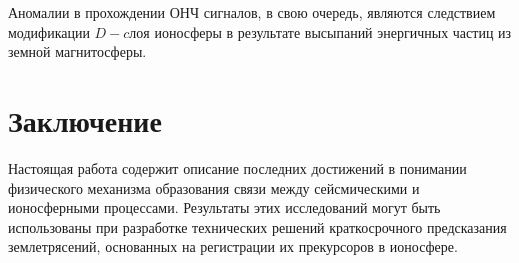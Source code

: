 \documentclass[12pt, oneside, a4paper]{article}
\begin{document}
Аномалии в прохождении ОНЧ сигналов, в свою очередь, являются следствием модификации $D-cлоя$ ионосферы в результате высыпаний энергичных частиц из земной магнитосферы.
\section{Заключение}
Настоящая работа содержит описание последних достижений в понимании физического механизма образования связи между сейсмическими и ионосферными процессами. Результаты этих исследований могут быть использованы при разработке технических решений краткосрочного предсказания землетрясений, основанных на регистрации их прекурсоров в ионосфере. 
\newpage


\end{document}
